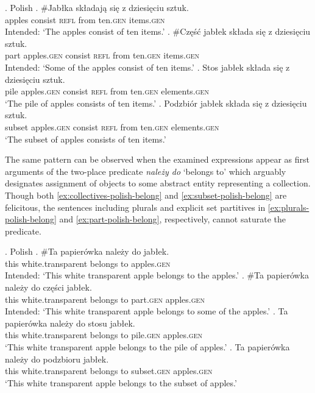 \ex.\label{ex:plurals-part-collectives-subset-polish-elements} Polish
\ag. \#Jabłka składają się z dziesięciu sztuk.\label{ex:plurals-polish-elements}\\
apples consist \textsc{refl} from ten\textsc{.gen} items\textsc{.gen}\\
Intended: `The apples consist of ten items.'
\bg. \#Część jabłek składa się z dziesięciu sztuk.\label{ex:part-polish-elements}\\
part apples\textsc{.gen} consist \textsc{refl} from ten\textsc{.gen} items\textsc{.gen}\\
Intended: `Some of the apples consist of ten items.'
\bg. Stos jabłek składa się z dziesięciu sztuk.\label{ex:collectives-polish-elements}\\
pile apples\textsc{.gen} consist \textsc{refl} from ten\textsc{.gen} elements\textsc{.gen}\\
`The pile of apples consists of ten items.'
\bg. Podzbiór jabłek składa się z dziesięciu sztuk.\label{ex:subset-polish-elements}\\
subset apples\textsc{.gen} consist \textsc{refl} from ten\textsc{.gen} elements\textsc{.gen}\\
`The subset of apples consists of ten items.'

The same pattern can be observed when the examined expressions appear as first arguments of the two-place predicate \textit{należy do} `belongs to' which arguably designates assignment of objects to some abstract entity representing a collection. Though both \ref{ex:collectives-polish-belong} and \ref{ex:subset-polish-belong} are felicitous, the sentences including plurals and explicit set partitives in \ref{ex:plurals-polish-belong} and \ref{ex:part-polish-belong}, respectively, cannot saturate the predicate.

\ex.\label{ex:plurals-part-collectives-subset-polish-belong} Polish
\ag. \#Ta papierówka należy do jabłek.\label{ex:plurals-polish-belong}\\
this white.transparent belongs to apples\textsc{.gen}\\
Intended: `This white transparent apple belongs to the apples.'
\bg. \#Ta papierówka należy do części jabłek.\label{ex:part-polish-belong}\\
this white.transparent belongs to part\textsc{.gen} apples\textsc{.gen}\\
Intended: `This white transparent apple belongs to some of the apples.'
\bg. Ta papierówka należy do stosu jabłek.\label{ex:collectives-polish-belong}\\
this white.transparent belongs to pile\textsc{.gen} apples\textsc{.gen}\\
`This white transparent apple belongs to the pile of apples.'
\bg. Ta papierówka należy do podzbioru jabłek.\label{ex:subset-polish-belong}\\
this white.transparent belongs to subset\textsc{.gen} apples\textsc{.gen}\\
`This white transparent apple belongs to the subset of apples.'

